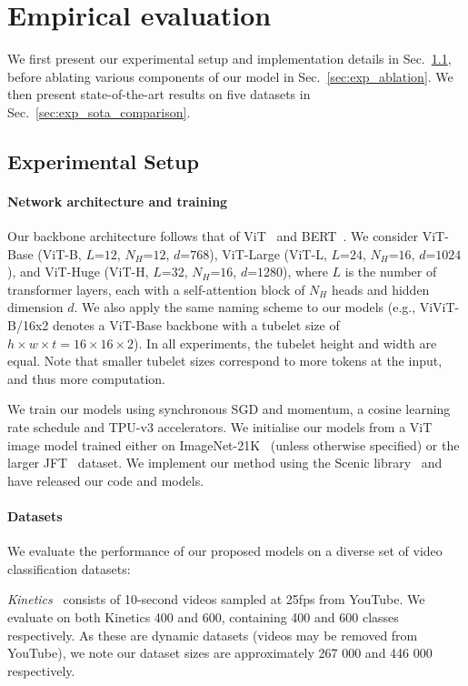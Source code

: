 \section{Empirical evaluation}

We first present our experimental setup and implementation details in Sec.~\ref{sec:exp_setup}, before ablating various components of our model in Sec.~\ref{sec:exp_ablation}. We then present state-of-the-art results on five datasets in Sec.~\ref{sec:exp_sota_comparison}.

\subsection{Experimental Setup}\label{sec:exp_setup}

\paragraph{Network architecture and training}
Our backbone architecture follows that of ViT~\cite{dosovitskiy_iclr_2021} and BERT~\cite{devlin_naacl_2019}. We consider ViT-Base (ViT-B, $L$=$12$, $N_H$=$12$, $d$=$768$), ViT-Large (ViT-L, $L$=$24$, $N_H$=$16$, $d$=$1024$), and ViT-Huge (ViT-H, $L$=$32$, $N_H$=$16$, $d$=$1280$), where $L$ is the number of transformer layers, each with a self-attention block of $N_H$ heads and hidden dimension $d$. 
We also apply the same naming scheme to our models (e.g., ViViT-B/16x2 denotes a ViT-Base backbone with a tubelet size of $h \times w \times t = 16 \times  16 \times  2$). In all experiments, the tubelet height and width are equal. 
Note that smaller tubelet sizes correspond to more tokens at the input, and thus more computation.

We train our models using synchronous SGD and momentum, a cosine learning rate schedule and TPU-v3 accelerators. %
We initialise our models from a ViT image model trained either on ImageNet-21K~\cite{deng_cvpr_2009} (unless otherwise specified) or the larger JFT~\cite{sun_iccv_2017} dataset.
We implement our method using the Scenic library~\cite{dehghani2021scenic} and have released our code and models.

\paragraph{Datasets}

We evaluate the performance of our proposed models on a diverse set of video classification datasets:

\emph{Kinetics}~\cite{kay_arxiv_2017} consists of 10-second videos sampled at 25fps from YouTube.
We evaluate on both Kinetics 400 and 600, containing 400 and 600 classes respectively.
As these are dynamic datasets (videos may be removed from YouTube), we note our dataset sizes are approximately 267 000 and 446 000 respectively.

